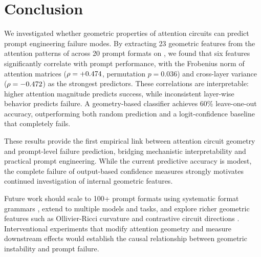 \section{Conclusion}
\label{sec:conclusion}

We investigated whether geometric properties of attention circuits can predict prompt engineering failure modes.
By extracting 23 geometric features from the attention patterns of \gptsmall across 20 prompt formats on \ssttwo, we found that six features significantly correlate with prompt performance, with the Frobenius norm of attention matrices ($\rho = +0.474$, permutation $p = 0.036$) and cross-layer variance ($\rho = -0.472$) as the strongest predictors.
These correlations are interpretable: higher attention magnitude predicts success, while inconsistent layer-wise behavior predicts failure.
A geometry-based classifier achieves 60\% leave-one-out accuracy, outperforming both random prediction and a logit-confidence baseline that completely fails.

These results provide the first empirical link between attention circuit geometry and prompt-level failure prediction, bridging mechanistic interpretability and practical prompt engineering.
While the current predictive accuracy is modest, the complete failure of output-based confidence measures strongly motivates continued investigation of internal geometric features.

Future work should scale to 100+ prompt formats using systematic format grammars \citep{sclar2023quantifying}, extend to multiple models and tasks, and explore richer geometric features such as Ollivier-Ricci curvature \citep{park2024geometry} and contrastive circuit directions \citep{suarez2026circuit}.
Interventional experiments that modify attention geometry and measure downstream effects would establish the causal relationship between geometric instability and prompt failure.
